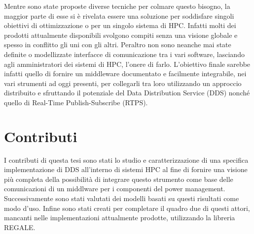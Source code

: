 Mentre sono state proposte diverse tecniche per colmare questo bisogno, %
la maggior parte di esse si è rivelata essere una soluzione per soddisfare singoli obiettivi di ottimizzazione o per un singolo sistema di HPC. Infatti molti dei prodotti attualmente disponibili svolgono compiti senza una visione globale e spesso in conflitto gli uni con gli altri. Peraltro non sono neanche mai state definite o modellizzate interfacce di comunicazione tra i vari software, lasciando agli amministratori dei sistemi di HPC, l'onere di farlo.
L'obiettivo finale sarebbe infatti quello di fornire un middleware documentato e facilmente integrabile, nei vari strumenti ad oggi presenti, per collegarli tra loro utilizzando un approccio distribuito e sfruttando il potenziale del Data Distribution Service (DDS) %
nonché quello di Real-Time Publish-Subscribe (RTPS).

\section{Contributi}
I contributi di questa tesi sono stati lo studio e caratterizzazione di una specifica implementazione di DDS all'interno di sistemi HPC al fine di fornire una visione più completa della possibilità di integrare questo strumento come base delle comunicazioni di un middlware per i componenti del power management. Successivamente sono stati valutati dei modelli basati su questi risultati come modo d'uso. Infine sono stati creati per completare il quadro due di questi attori, mancanti nelle implementazioni attualmente prodotte, utilizzando la libreria REGALE.


